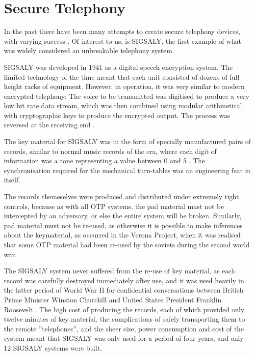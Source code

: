         
\section{Secure Telephony}

	In the past there have been many attempts to create secure telephony devices, with varying success \cite{RN30}.
        Of interest to us, is SIGSALY, the first example of what was widely considered an unbreakable telephony system.
        
	SIGSALY was developed in 1941 as a digital speech encryption system.
        The limited technology of the time meant that each unit consisted of dozens of full-height racks of equipment.
        However, in operation, it was very similar to modern encrypted telephony:
        The voice to be transmitted was digitised to produce a very low bit rate data stream, which was then combined using modular arithmetical with cryptographic keys to produce the encrypted output. The process was reversed at the receiving end \cite{bennett1983secret,RN21}.

        The key material for SIGSALY was in the form of specially manufactured pairs of records, similar to normal music records of the era, where each digit of information was a tone representing a value between 0 and 5 \cite{bennett1983secret}.  The synchronisation required for the mechanical turn-tables was an engineering feat in itself.
        
        The records themeselves were produced and distributed under extremely tight controls, because as with all OTP systems, the pad material must not be intercepted by an adversary, or else the entire system will be broken.
        Similarly, pad material must not be re-used, as otherwise it is possible to make inferences about the keymaterial, as occurred in the Verona Project, when it was realised that some OTP material had been re-used by the soviets during the second world war\cite{cohen1997venona,mcgrew2002counter}.

        The SIGSALY system never suffered from the re-use of key material, as each record was carefully destroyed immediately after use,
        and it was used heavily in the latter period of World War II for confidential conversations between British Prime Minister Winston Churchill and United States President Franklin Roosevelt \cite{RN21}.
        The high cost of producing the records, each of which provided only twelve minutes of key material, the complications of safely transporting them to the remote ''telephones'', and the sheer size, power consumption and cost of the system meant that SIGSALY was only used for a period of four years, and only 12 SIGSALY systems were built\cite{RN21}.
    
